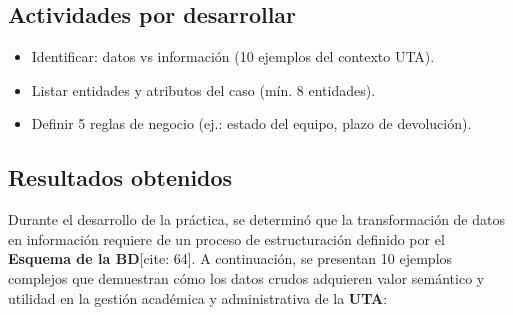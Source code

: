 \documentclass{article}
\begin{document}
\subsection{Actividades por desarrollar}
\begin{itemize}
    \item Identificar: datos vs información (10 ejemplos del contexto UTA).
    \item Listar entidades y atributos del caso (mín. 8 entidades).
    \item Definir 5 reglas de negocio (ej.: estado del equipo, plazo de devolución).
\end{itemize}
\subsection{Resultados obtenidos}

Durante el desarrollo de la práctica, se determinó que la transformación de datos en información requiere de un proceso de estructuración definido por el \textbf{Esquema de la BD}[cite: 64]. A continuación, se presentan 10 ejemplos complejos que demuestran cómo los datos crudos adquieren valor semántico y utilidad en la gestión académica y administrativa de la \textbf{UTA}:
\end{document}
